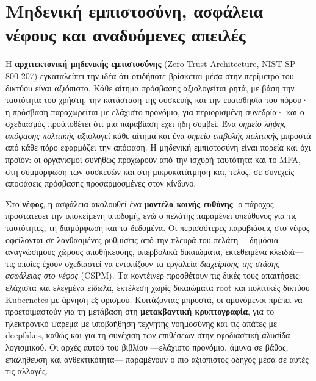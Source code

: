 \documentclass[11pt,openany]{book}
\begin{document}
\section{Μηδενική εμπιστοσύνη, ασφάλεια νέφους και αναδυόμενες απειλές}\label{sec:13.7}
Η \textbf{αρχιτεκτονική μηδενικής εμπιστοσύνης} (Zero Trust Architecture, NIST SP 800-207) εγκαταλείπει την ιδέα ότι οτιδήποτε βρίσκεται μέσα στην περίμετρο του δικτύου είναι αξιόπιστο. Κάθε αίτημα πρόσβασης αξιολογείται ρητά, με βάση την ταυτότητα του χρήστη, την κατάσταση της συσκευής και την ευαισθησία του πόρου· η πρόσβαση παραχωρείται με ελάχιστο προνόμιο, για περιορισμένη συνεδρία· και ο σχεδιασμός προϋποθέτει ότι μια παραβίαση έχει ήδη συμβεί. Ένα \emph{σημείο λήψης απόφασης πολιτικής} αξιολογεί κάθε αίτημα και ένα \emph{σημείο επιβολής πολιτικής} μπροστά από κάθε πόρο εφαρμόζει την απόφαση. Η μηδενική εμπιστοσύνη είναι πορεία και όχι προϊόν: οι οργανισμοί συνήθως προχωρούν από την ισχυρή ταυτότητα και το MFA, στη συμμόρφωση των συσκευών και στη μικροκατάτμηση και, τέλος, σε συνεχείς αποφάσεις πρόσβασης προσαρμοσμένες στον κίνδυνο.

Στο \textbf{νέφος}, η ασφάλεια ακολουθεί ένα \textbf{μοντέλο κοινής ευθύνης}: ο πάροχος προστατεύει την υποκείμενη υποδομή, ενώ ο πελάτης παραμένει υπεύθυνος για τις ταυτότητες, τη διαμόρφωση και τα δεδομένα. Οι περισσότερες παραβιάσεις στο νέφος οφείλονται σε λανθασμένες ρυθμίσεις από την πλευρά του πελάτη —δημόσια αναγνώσιμους χώρους αποθήκευσης, υπερβολικά δικαιώματα, εκτεθειμένα κλειδιά— τις οποίες έχουν σχεδιαστεί να εντοπίζουν τα εργαλεία \emph{διαχείρισης της στάσης ασφάλειας στο νέφος} (CSPM). Τα κοντέινερ προσθέτουν τις δικές τους απαιτήσεις: ελάχιστα και ελεγμένα είδωλα, εκτέλεση χωρίς δικαιώματα root και πολιτικές δικτύου Kubernetes με άρνηση εξ ορισμού. Κοιτάζοντας μπροστά, οι αμυνόμενοι πρέπει να προετοιμαστούν για τη μετάβαση στη \textbf{μετακβαντική κρυπτογραφία}, για το ηλεκτρονικό ψάρεμα με υποβοήθηση τεχνητής νοημοσύνης και τις απάτες με deepfakes, καθώς και για τη συνέχιση των επιθέσεων στην εφοδιαστική αλυσίδα λογισμικού. Οι αρχές αυτού του βιβλίου —ελάχιστο προνόμιο, άμυνα σε βάθος, επαλήθευση και ανθεκτικότητα— παραμένουν ο πιο αξιόπιστος οδηγός μέσα σε αυτές τις αλλαγές.
\end{document}
